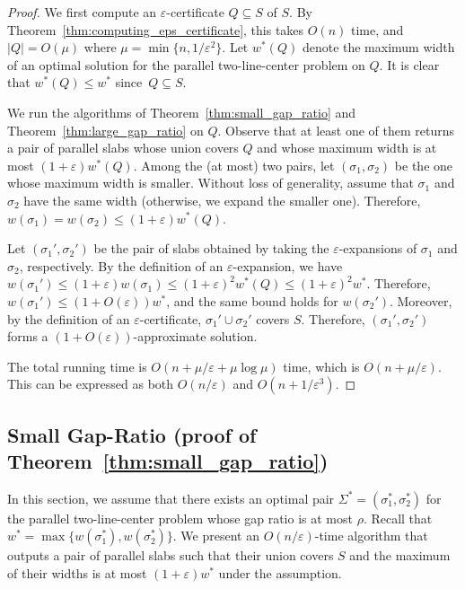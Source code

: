 \documentclass[english,a4paper, cleveref, autoref, thm-restate, nolineno]{socg-lipics-v2021}
\theoremstyle{star}
\theoremstyle{claimstar}
\newcommand{\eps}{\ensuremath{\varepsilon}}
\begin{document}
\begin{proof}
    We first compute an $\eps$-certificate $Q\subseteq S$ of $S$. 
By Theorem~\ref{thm:computing_eps_certificate}, this takes $O(n)$ time, and $|Q| = O(\mu)$ where $\mu = \min \{n, 1/\eps^2\}$. 
Let $w^*(Q)$ denote the maximum width of an optimal solution for the parallel two-line-center problem on $Q$. It is clear that $w^*(Q) \le w^*$ since~$Q\subseteq S$. 

We run the algorithms of Theorem~\ref{thm:small_gap_ratio} and Theorem~\ref{thm:large_gap_ratio} on $Q$. 
Observe that at least one of them returns a pair of parallel slabs whose union covers $Q$ and whose maximum width is at most $(1+\eps)w^*(Q)$.
Among the (at most) two pairs, let $(\sigma_1, \sigma_2)$ be the one whose maximum width is smaller.
Without loss of generality, assume that $\sigma_1$ and $\sigma_2$ have the same width (otherwise, we expand the smaller one). Therefore, $w(\sigma_1) = w(\sigma_2) \le (1+\eps)w^*(Q)$.

Let $(\sigma_1', \sigma_2')$ be the pair of slabs obtained by taking the $\eps$-expansions of $\sigma_1$ and $\sigma_2$, respectively.  
By the definition of an $\eps$-expansion, we have $w(\sigma_1') \le (1+\eps)w(\sigma_1) \le (1+\eps)^2w^*(Q) \le (1+\eps)^2w^*$. 
Therefore, $w(\sigma_1')\le (1+O(\eps)) w^*$, and the same bound holds for $w(\sigma_2')$.
Moreover, by the definition of an $\eps$-certificate, $\sigma_1' \cup \sigma_2'$ covers $S$.  
Therefore, $(\sigma_1', \sigma_2')$ forms a $(1+O(\eps))$-approximate solution.

The total running time is $O(n + \mu/\eps + \mu \log \mu)$ time, which is $O(n + \mu /\eps)$. 
This can be expressed as both $O(n/\eps)$ and $O(n + 1/\eps^3)$.
\end{proof}





\subsection{Small Gap-Ratio (proof of Theorem~\ref{thm:small_gap_ratio})}
\label{sec:small_gap_ratio}
In this section, we assume that there exists an optimal pair $\Sigma^* = (\sigma_1^*, \sigma_2^*)$ for the parallel two-line-center problem whose gap ratio is at most $\rho$. 
Recall that $w^* = \max \{w(\sigma_1^*), w(\sigma_2^*) \}$.
We present an $O(n/\eps)$-time algorithm that outputs a pair of parallel slabs such that their union covers $S$ and the maximum of their widths is at most $(1+\eps)w^*$ under the assumption.
\end{document}
